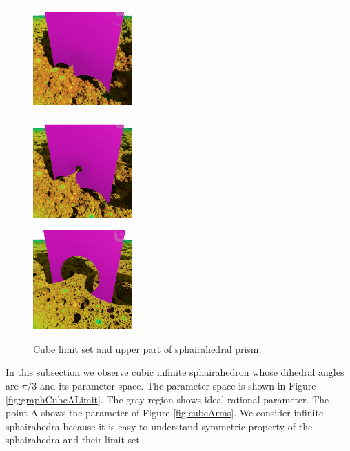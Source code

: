 \documentclass[suppldata, dvipdfmx]{interact}
\theoremstyle{plain}%
\theoremstyle{definition}
\theoremstyle{remark}
\theoremstyle{problemstyle}
\begin{document}
\begin{figure}[h!tbp]
 \begin{minipage}[t]{0.3\textwidth}
  \centering
  \includegraphics[width=1.5in, keepaspectratio]{./img/visualization/cubePrism.jpg}
  \subcaption{}
  \label{fig:upperPrism}
 \end{minipage}
 \hspace*{\fill}
 \begin{minipage}[t]{0.3\textwidth}
  \centering
  \includegraphics[width=1.5in, keepaspectratio]{./img/visualization/cubeSmallHole.jpg}
  \subcaption{}
  \label{fig:upperPrismSmallHole}
  \end{minipage}
 \hspace*{\fill}
 \begin{minipage}[t]{0.3\textwidth}
  \centering
  \includegraphics[width=1.5in, keepaspectratio]{./img/visualization/cubeHole.jpg}
  \subcaption{}
  \label{fig:upperPrismBigHole}
 \end{minipage}
 \hspace*{\fill}
 \caption{Cube limit set and upper part of sphairahedral prism.}
 \label{fig:cubeHole}
\end{figure}

In this subsection we observe cubic infinite sphairahedron whose
dihedral angles are $\pi / 3$ and its parameter space.
The parameter space is shown in Figure \ref{fig:graphCubeALimit}.
The gray region shows ideal rational parameter. The point A shows the
parameter of Figure \ref{fig:cubeArms}.
We consider infinite sphairahedra because it is easy to understand
symmetric property of the sphairahedra and their limit set.
\end{document}
